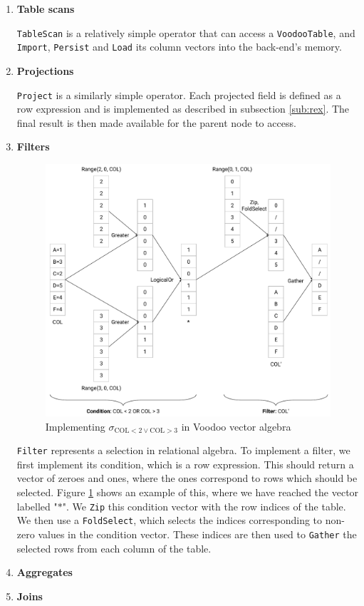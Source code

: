 \begin{enumerate}
    \item \textbf{Table scans}
    
    \texttt{TableScan} is a relatively simple operator that can access a \texttt{VoodooTable}, and \texttt{Import}, \texttt{Persist} and \texttt{Load} its column vectors into the back-end's memory.
    
    \item \textbf{Projections}
    
    \texttt{Project} is a similarly simple operator. Each projected field is defined as a row expression and is implemented as described in subsection \ref{sub:rex}. The final result is then made available for the parent node to access.
    
    \item \textbf{Filters}
    
    \begin{figure}
        \centering
        \includegraphics[width=0.75\linewidth]{appendix/filter.pdf}
        \caption{Implementing $\sigma_{\text{COL} < 2 \lor \text{COL} > 3}$ in Voodoo vector algebra}
        \label{fig:filter}
    \end{figure}
    
    \texttt{Filter} represents a selection in relational algebra. To implement a filter, we first implement its condition, which is a row expression. This should return a vector of zeroes and ones, where the ones correspond to rows which should be selected. Figure \ref{fig:filter} shows an example of this, where we have reached the vector labelled "$*$". We \texttt{Zip} this condition vector with the row indices of the table. We then use a \texttt{FoldSelect}, which selects the indices corresponding to non-zero values in the condition vector. These indices are then used to \texttt{Gather} the selected rows from each column of the table.
    
    \item \textbf{Aggregates}
    
    
    
    \item \textbf{Joins}
    
    
\end{enumerate}

